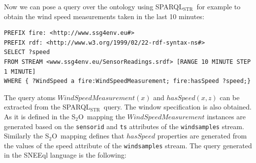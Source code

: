 \documentclass[runningheads,a4paper]{llncs}
\newcommand{\subscript}[1]{\ensuremath{_{\textrm{#1}}}}
\newcommand{\stwoo}{\textsf{S\subscript{2}O}}
\newcommand{\sparqlstr}{SPARQL\subscript{STR}}
\begin{document}
Now we can pose a query over the ontology using \sparqlstr\, for example to obtain the wind speed measurements taken in the last 10 minutes:
%
\begin{lstlisting}[style=SPARQLSTRStyle,language=SPARQLSTR,frame=none]
PREFIX fire: <http://www.ssg4env.eu#>
PREFIX rdf: <http://www.w3.org/1999/02/22-rdf-syntax-ns#>
SELECT ?speed
FROM STREAM <www.ssg4env.eu/SensorReadings.srdf> [RANGE 10 MINUTE STEP 1 MINUTE]
WHERE { ?WindSpeed a fire:WindSpeedMeasurement; fire:hasSpeed ?speed;}
\end{lstlisting}
%
The query atoms $WindSpeedMeasurement(x)$ and $hasSpeed(x,z)$ can be extracted from the \sparqlstr\ query. The window specification %
is also obtained. As it is defined in the \stwoo\ mapping the $WindSpeedMeasurement$ instances are generated based on the \texttt{sensorid} and \texttt{ts} attributes of the \texttt{windsamples} stream.
Similarly the \stwoo\ mapping defines that $hasSpeed$ properties are generated from the values of the speed attribute of the \texttt{windsamples} stream. 
The query generated in the SNEEql language is the following:
\end{document}
